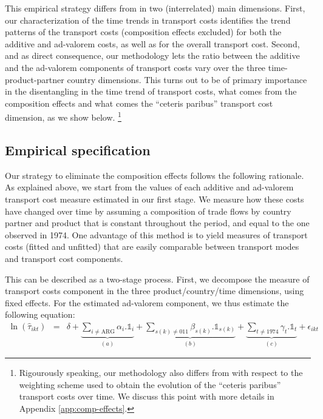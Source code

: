 \documentclass[a4paper,11pt]{article}
\begin{document}
This empirical strategy differs from \cite{hummels2007} in two (interrelated) main dimensions. First, our characterization of the time trends in transport costs identifies the trend patterns of the transport costs (composition effects excluded) for both the additive and ad-valorem costs, as well as for the overall transport cost. Second, and as direct consequence, our methodology lets the ratio between the additive and the ad-valorem components of transport costs vary over the three time-product-partner country dimensions. %
This turns out to be of primary importance in the disentangling in the time trend of transport costs, what comes from the composition effects and what comes the ``ceteris paribus'' transport cost dimension, as we show below. \footnote{Rigourously speaking, our methodology also differs from  \citet{hummels2007} with respect to the weighting scheme used to obtain the evolution of the ``ceteris paribus'' transport costs over time. We discuss this point with more details in Appendix \ref{app:comp-effects}.}

\subsection{Empirical specification}
Our strategy to eliminate the composition effects follows the following rationale. As explained above, we start from the values of each additive and ad-valorem transport cost measure estimated in our first stage. We measure how these costs have changed over time by assuming a composition of trade flows by country partner and product that is constant throughout the period, and equal to the one observed in 1974. One advantage of this method is to yield measures of transport costs (fitted and unfitted) that are easily comparable between transport modes and transport cost components.

This can be described as a two-stage process. First, we decompose the measure of transport costs component in the three product/country/time dimensions, using fixed effects. For the estimated ad-valorem component, we thus estimate the following equation:
\begin{eqnarray}
\ln(\widehat{\tau}_{ikt})&=&\delta +\underbrace{\sum_{i \neq \text{ARG}}\alpha_i.\mathbb{1}_i}_{(a)} + \underbrace{\sum_{s(k)\neq \text{011}}\beta_{s(k)}.\mathbb{1}_{s(k)}}_{(b)} + \underbrace{\sum_{t \neq 1974}\gamma_t.\mathbb{1}_t}_{(c)}+\epsilon_{ikt} \label{eq:compeffects_mult}
\end{eqnarray}
\end{document}
